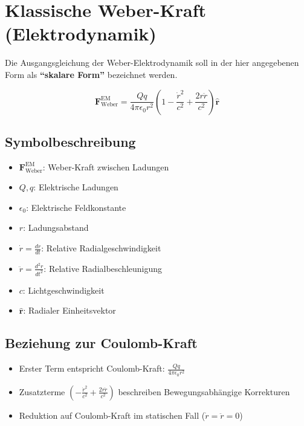 \section{Klassische Weber-Kraft (Elektrodynamik)}
Die Ausgangsgleichung der Weber-Elektrodynamik soll in der hier angegebenen Form als \textbf{\enquote{skalare Form}} bezeichnet werden.

\begin{equation}
    \boxed
    {
        \bm{F}_{\text{Weber}}^{\text{EM}} = \frac{Qq}{4\pi\epsilon_0 r^2}\left(1 - \frac{\dot{r}^2}{c^2} + \frac{2r\ddot{r}}{c^2}\right)\bm{\hat{r}}
    }
\end{equation}

\subsection*{Symbolbeschreibung}
\begin{itemize}[leftmargin=*,noitemsep]
    \item $\bm{F}_{\text{Weber}}^{\text{EM}}$: Weber-Kraft zwischen Ladungen
    \item $Q, q$: Elektrische Ladungen
    \item $\epsilon_0$: Elektrische Feldkonstante
    \item $r$: Ladungsabstand
    \item $\dot{r} = \frac{dr}{dt}$: Relative Radialgeschwindigkeit
    \item $\ddot{r} = \frac{d^2r}{dt^2}$: Relative Radialbeschleunigung
    \item $c$: Lichtgeschwindigkeit
    \item $\bm{\hat{r}}$: Radialer Einheitsvektor
\end{itemize}

\subsection*{Beziehung zur Coulomb-Kraft}
\begin{itemize}[leftmargin=*,noitemsep]
    \item Erster Term entspricht Coulomb-Kraft: $\frac{Qq}{4\pi\epsilon_0 r^2}$
    \item Zusatzterme $\left(-\frac{\dot{r}^2}{c^2} + \frac{2r\ddot{r}}{c^2}\right)$ beschreiben Bewegungsabhängige Korrekturen
    \item Reduktion auf Coulomb-Kraft im statischen Fall ($\dot{r} = \ddot{r} = 0$)
\end{itemize}

